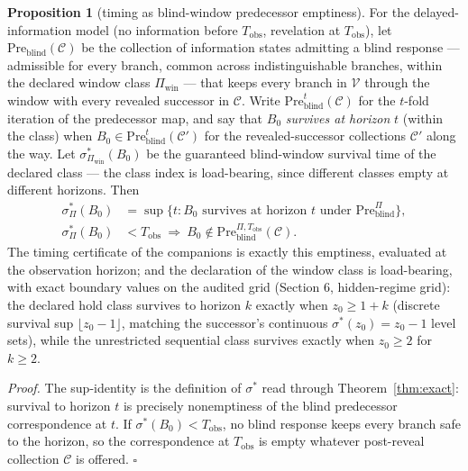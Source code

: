 \documentclass[10pt,twocolumn]{article}
\theoremstyle{definition}
\newtheorem{proposition}{Proposition}
\begin{document}
\begin{proposition}[timing as blind-window predecessor emptiness]\label{prop:timing}
For the delayed-information model (no information before \(T_{\mathrm{obs}}\),
revelation at \(T_{\mathrm{obs}}\)), let
\(\mathrm{Pre}_{\mathrm{blind}}(\mathscr{C})\) be the collection of
information states admitting a blind response --- admissible for every
branch, common across indistinguishable branches, within the declared
window class \(\Pi_{\mathrm{win}}\) --- that keeps every branch in
\(\mathcal{V}\) through the window with every revealed successor in
\(\mathscr{C}\). Write \(\mathrm{Pre}_{\mathrm{blind}}^{t}(\mathscr{C})\)
for the \(t\)-fold iteration of the predecessor map, and say that
\(B_0\) \emph{survives at horizon} \(t\) (within the class) when
\(B_0 \in \mathrm{Pre}_{\mathrm{blind}}^{t}(\mathscr{C}')\) for the
revealed-successor collections \(\mathscr{C}'\) along the way. Let
\(\sigma^{*}_{\Pi_{\mathrm{win}}}(B_0)\) be the guaranteed
blind-window survival time of the declared class --- the class index is
load-bearing, since different classes empty at different horizons. Then
\begin{align*}
\sigma^{*}_{\Pi}(B_0) &= \sup \{ t : B_0 \text{ survives at horizon } t
\text{ under } \mathrm{Pre}_{\mathrm{blind}}^{\Pi} \}, \\
\sigma^{*}_{\Pi}(B_0) &< T_{\mathrm{obs}} \ \Longrightarrow\ B_0 \notin
\mathrm{Pre}_{\mathrm{blind}}^{\Pi, T_{\mathrm{obs}}}(\mathscr{C}).
\end{align*}
The timing certificate of the companions is exactly this emptiness, evaluated
at the observation horizon; and the declaration of the window class is
load-bearing, with exact boundary values on the audited grid (Section 6,
hidden-regime grid): the declared hold class survives to horizon \(k\)
exactly when \(z_{0} \ge 1 + k\) (discrete survival sup
\(\lfloor z_{0} - 1 \rfloor\), matching the successor's continuous
\(\sigma^{*}(z_{0}) = z_{0} - 1\) level sets), while the unrestricted
sequential class survives exactly when \(z_{0} \ge 2\) for \(k \ge 2\).
\end{proposition}

\emph{Proof.} The sup-identity is the definition of \(\sigma^{*}\) read
through Theorem~\ref{thm:exact}: survival to horizon \(t\) is precisely
nonemptiness of the blind predecessor correspondence at \(t\). If
\(\sigma^{*}(B_0) < T_{\mathrm{obs}}\), no blind response keeps every branch
safe to the horizon, so the correspondence at \(T_{\mathrm{obs}}\) is empty
whatever post-reveal collection \(\mathscr{C}\) is offered. \hfill\(\square\)
\end{document}
